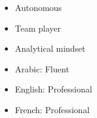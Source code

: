 \twocolumnsection
{
    \vspace{1em}
    \begin{itemize}
    	\item Autonomous
    	\item Team player
        \item Analytical mindset
    \end{itemize}}
{
\vspace{1em}
\begin{itemize}
    \item Arabic: Fluent
    \item English: Professional
    \item French: Professional
\end{itemize}}

